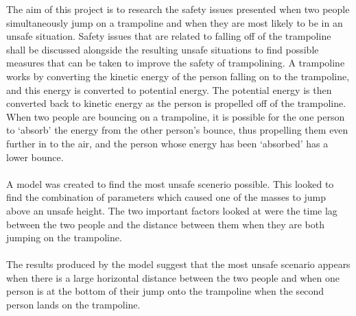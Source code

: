\noindent The aim of this project is to research the safety issues presented when two people simultaneously jump on a trampoline and when they are most likely to be in an unsafe situation. Safety issues that are related to falling off of the trampoline shall be discussed alongside the resulting unsafe situations to find possible measures that can be taken to improve the safety of trampolining. A trampoline works by converting the kinetic energy of the person falling on to the trampoline, and this energy is converted to potential energy. The potential energy is then converted back to kinetic energy as the person is propelled off of the trampoline. When two people are bouncing on a trampoline, it is possible for the one person to `absorb' the energy from the other person's bounce, thus propelling them even further in to the air, and the person whose energy has been `absorbed' has a lower bounce.
\\
\\
\noindent A model was created to find the most unsafe scenerio possible. This looked to find the combination of parameters which caused one of the masses to jump above an unsafe height. The two important factors looked at were the time lag between the two people and the distance between them when they are both jumping on the trampoline. 
\\
\\
\noindent The results produced by the model suggest that the most unsafe scenario appears when there is a large horizontal distance between the two people and when one person is at the bottom of their jump onto the trampoline when the second person lands on the trampoline.